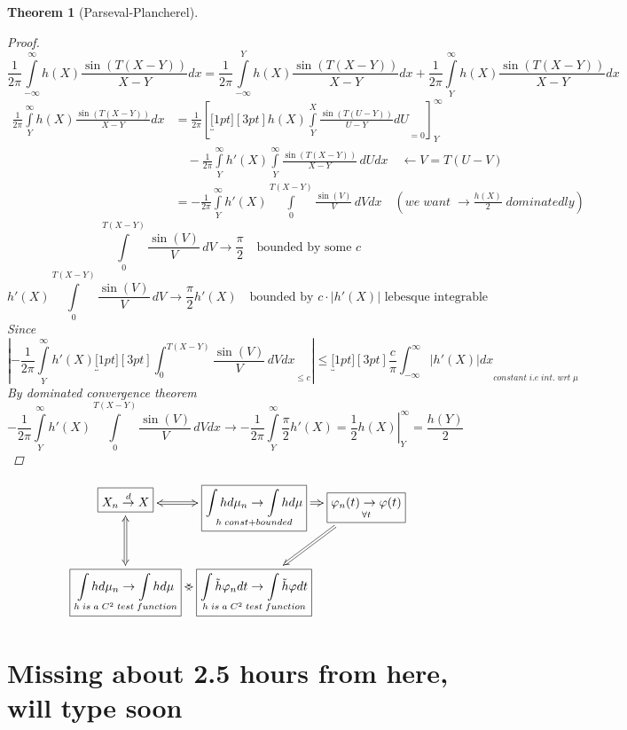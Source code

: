 \documentclass[12pt]{article}
\newtheorem{theorem}{Theorem}[section]
\begin{document}
\begin{theorem}[Parseval-Plancherel]
\begin{proof}
\[\frac{1}{2 \pi}\int\limits_{-\infty}^{\infty} h(X)\frac{\sin(T(X -Y))}{X -Y} dx = \frac{1}{2 \pi}\int\limits_{-\infty}^{Y} h(X)\frac{\sin(T(X -Y))}{X -Y} dx + \frac{1}{2 \pi}\int\limits_{Y}^{\infty} h(X)\frac{\sin(T(X -Y))}{X -Y} dx\]
\begin{align*}
 \frac{1}{2 \pi}\int\limits_{Y}^{\infty} h(X)\frac{\sin(T(X-Y))}{X- Y} dx &=  \frac{1}{2 \pi}\left[\underbracket[1pt][3pt]{h(X)\int\limits_{Y}^{X} \frac{\sin(T(U-Y))}{U-Y} dU}_{=0}\right]_{Y}^{\infty} \\
&\quad -  \frac{1}{2 \pi}\int\limits_{Y}^{\infty} h'(X)\int\limits_{Y}^{\infty}\frac{\sin(T(X-Y))}{X- Y}\, dU dx \quad \leftarrow V=T(U-V)\\
&= -  \frac{1}{2 \pi}\int\limits_{Y}^{\infty} h'(X)\int\limits_{0}^{T(X-Y)}\frac{\sin(V)}{V}\, dV dx
 \quad (we\; want\; \rightarrow \tfrac{h(X)}{2}\;dominatedly)
\end{align*}
\[\int\limits_{0}^{T(X-Y)}\frac{\sin(V)}{V}\, dV \rightarrow\frac{\pi}{2}\quad \text{bounded by some }c\]
\[h'(X)\int\limits_{0}^{T(X-Y)}\frac{\sin(V)}{V}\, dV \rightarrow\frac{\pi}{2}h'(X)\quad \text{bounded by }c\cdot|h'(X)| \text{ lebesque integrable}\]
Since
\[\left|-  \frac{1}{2 \pi}\int\limits_{Y}^{\infty} h'(X)\underbracket[1pt][3pt]{\int_{0}^{T(X-Y)}\frac{\sin(V)}{V}\, dV dx}_{\leq c} \right| \leq \underbracket[1pt][3pt]{\frac{c}{\pi} \int_{-\infty}^{\infty}|h'(X)|dx}_{constant\; i.e \; int. \; wrt \; \mu}\]
By dominated convergence theorem
\[-  \frac{1}{2 \pi}\int\limits_{Y}^{\infty} h'(X)\int\limits_{0}^{T(X-Y)}\frac{\sin(V)}{V}\, dV dx \rightarrow -  \frac{1}{2 \pi}\int\limits_{Y}^{\infty}\frac{\pi}{2}h'(X) = \left.\frac{1}{2}h(X)\right|_{Y}^{\infty} = \frac{h(Y)}{2}\]


\end{proof}
\end{theorem}




\[\xymatrix
@C-1.5pc{\ar @{} [dr] 
&\boxed{X_n \overset{d}{\rightarrow} X}\ar@{<=>}[d]  \ar@{<=>}[r]  & \boxed{\underset{h \; const + bounded}{\int h d\mu_n \rightarrow \int hd\mu}} \ar@{=>}[r] &\boxed{\underset{\forall t}{\varphi_n(t)\rightarrow \varphi(t)}} \ar@{=>}[dl]  \\
 &\boxed{\underset{h \;is \; a\; C^2 \; test\;function}{\int h d\mu_n \rightarrow \int hd\mu}}  \ar@{<=>}[r]  &\boxed{\underset{h \;is \; a\; C^2 \; test\;function}{\int \tilde{h}\varphi_n dt \rightarrow \int \tilde{h}\varphi dt }} } \]


\section{Missing about 2.5 hours from here, will type soon}
\end{document}
